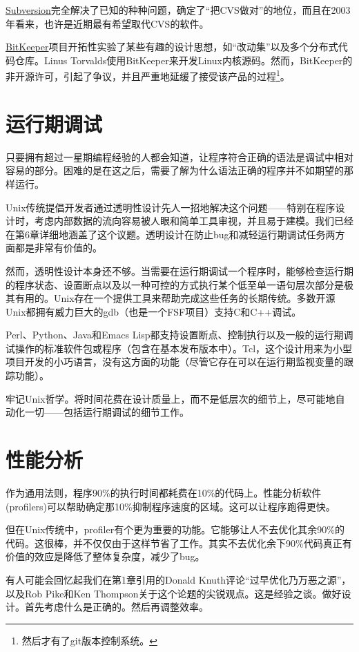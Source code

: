 \documentclass[12pt,oneside]{book}
\begin{document}
\href{http://subversion.tigris.org/}{Subversion}完全解决了已知的种种问题，确定了“把CVS做对”的地位，而且在2003年看来，也许是近期最有希望取代CVS的软件。

\href{http://www.bitkeeper.com/}{BitKeeper}项目开拓性实验了某些有趣的设计思想，如“改动集”以及多个分布式代码仓库。Linus Torvalds使用BitKeeper来开发Linux内核源码。然而，BitKeeper的非开源许可，引起了争议，并且严重地延缓了接受该产品的过程\footnote{然后才有了git版本控制系统。}。

\section{运行期调试}
只要拥有超过一星期编程经验的人都会知道，让程序符合正确的语法是调试中相对容易的部分。困难的是在这之后，需要了解为什么语法正确的程序并不如期望的那样运行。

Unix传统提倡开发者通过透明性设计先人一招地解决这个问题——特别在程序设计时，考虑内部数据的流向容易被人眼和简单工具审视，并且易于建模。我们已经在第6章详细地涵盖了这个议题。透明设计在防止bug和减轻运行期调试任务两方面都是非常有价值的。

然而，透明性设计本身还不够。当需要在运行期调试一个程序时，能够检查运行期的程序状态、设置断点以及以一种可控的方式执行某个低至单一语句层次部分是极其有用的。Unix存在一个提供工具来帮助完成这些任务的长期传统。多数开源Unix都拥有威力巨大的gdb（也是一个FSF项目）支持C和C++调试。

Perl、Python、Java和Emacs Lisp都支持设置断点、控制执行以及一般的运行期调试操作的标准软件包或程序（包含在基本发布版本中）。Tcl，这个设计用来为小型项目开发的小巧语言，没有这方面的功能（尽管它存在可以在运行期监视变量的跟踪功能）。

牢记Unix哲学。将时间花费在设计质量上，而不是低层次的细节上，尽可能地自动化一切——包括运行期调试的细节工作。


\section{性能分析}
作为通用法则，程序90\%{}的执行时间都耗费在10\%{}的代码上。性能分析软件(profilers)可以帮助确定那10\%{}抑制程序速度的区域。这可以让程序跑得更快。

但在Unix传统中，profiler有个更为重要的功能。它能够让人不去优化其余90\%{}的代码。这很棒，并不仅仅由于这样节省了工作。其实不去优化余下90\%{}代码真正有价值的效应是降低了整体复杂度，减少了bug。

有人可能会回忆起我们在第1章引用的Donald Knuth评论“过早优化乃万恶之源”，以及Rob Pike和Ken Thompson关于这个论题的尖锐观点。这是经验之谈。做好设计。首先考虑什么是正确的。然后再调整效率。
\end{document}
